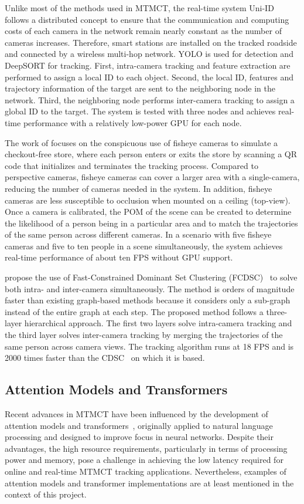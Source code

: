 Unlike most of the methods used in MTMCT, the real-time system Uni-ID~\cite{Chen22} follows a distributed concept to ensure that the communication and computing costs of each camera in the network remain nearly constant as the number of cameras increases. Therefore, smart stations are installed on the tracked roadside and connected by a wireless multi-hop network. YOLO is used for detection and DeepSORT for tracking. First, intra-camera tracking and feature extraction are performed to assign a local ID to each object. Second, the local ID, features and trajectory information of the target are sent to the neighboring node in the network. Third, the neighboring node performs inter-camera tracking to assign a global ID to the target. The system is tested with three nodes and achieves real-time performance with a relatively low-power GPU for each node.

The work of \textcite{Wang21} focuses on the conspicuous use of fisheye cameras to simulate a checkout-free store, where each person enters or exits the store by scanning a QR code that initializes and terminates the tracking process. Compared to perspective cameras, fisheye cameras can cover a larger area with a single-camera, reducing the number of cameras needed in the system. In addition, fisheye cameras are less susceptible to occlusion when mounted on a ceiling (top-view). Once a camera is calibrated, the POM of the scene can be created to determine the likelihood of a person being in a particular area and to match the trajectories of the same person across different cameras. In a scenario with five fisheye cameras and five to ten people in a scene simultaneously, the system achieves real-time performance of about ten FPS without GPU support.

\citeauthor{Tesfaye19} propose the use of Fast-Constrained Dominant Set Clustering (FCDSC)~\cite{Tesfaye19} to solve both intra- and inter-camera simultaneously. The method is orders of magnitude faster than existing graph-based methods because it  considers only a sub-graph instead of the entire graph at each step. The proposed method follows a three-layer hierarchical approach. The first two layers solve intra-camera tracking and the third layer solves inter-camera tracking by merging the trajectories of the same person across camera views. The tracking algorithm runs at 18 FPS and is 2000 times faster than the CDSC~\cite{Zemene16} on which it is based.

\subsection{Attention Models and Transformers}\label{subsec:attention_models_and_transformers}
Recent advances in MTMCT have been influenced by the development of attention models and transformers~\cite{Vaswani17}, originally applied to natural language processing and designed to improve focus in neural networks. Despite their advantages, the high resource requirements, particularly in terms of processing power and memory, pose a challenge in achieving the low latency required for online and real-time MTMCT tracking applications. Nevertheless, examples of attention models and transformer implementations are at least mentioned in the context of this project.

